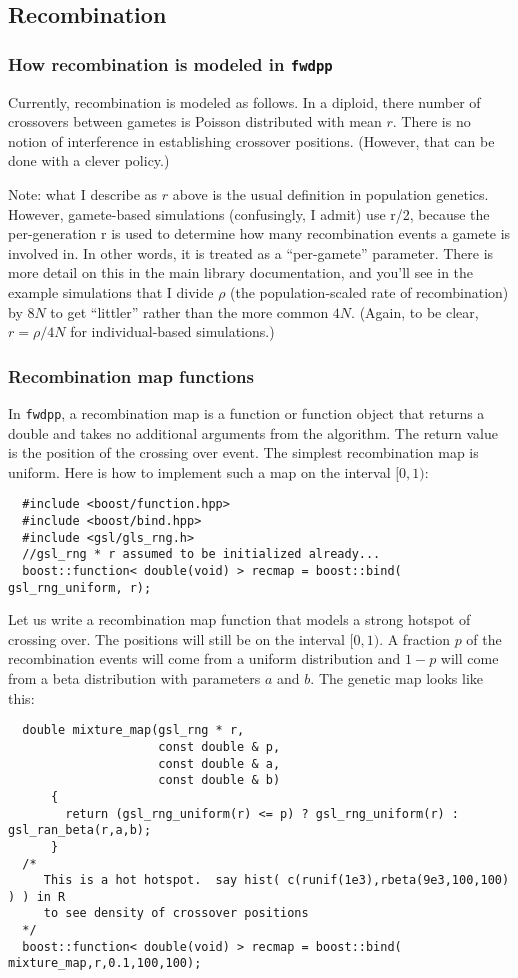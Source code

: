 \documentclass{article}
\begin{document}
\subsection{Recombination}
\subsubsection{\label{recmodel}How recombination is modeled in \texttt{fwdpp}}
Currently, recombination is modeled as follows.  In a diploid, there number of crossovers between gametes is Poisson distributed with mean $r$.  There is no notion of interference in establishing crossover positions.  (However, that can be done with a clever policy.)

Note: what I describe as $r$ above is the usual definition in population genetics. However, gamete-based simulations (confusingly, I admit) use r/2, because the per-generation r is used to determine how many recombination events a gamete is involved in.  In other words, it is treated as a ``per-gamete'' parameter.  There is more detail on this in the main library documentation, and you'll see in the example simulations that I divide $\rho$ (the population-scaled rate of recombination) by $8N$ to get ``littler'' rather than the more common $4N$.  (Again, to be clear, $r=\rho/4N$ for individual-based simulations.)

\subsubsection{Recombination map functions}
In \texttt{fwdpp}, a recombination map is a function or function object that returns a double and takes no additional arguments from the algorithm.  The return value is the position of the crossing over event.  The simplest recombination map is uniform.  Here is how to implement such a map on the interval $[0,1)$:

\begin{lstlisting}
  #include <boost/function.hpp>
  #include <boost/bind.hpp>
  #include <gsl/gls_rng.h>
  //gsl_rng * r assumed to be initialized already...
  boost::function< double(void) > recmap = boost::bind( gsl_rng_uniform, r);
\end{lstlisting}

Let us write a recombination map function that models a strong hotspot of crossing over.  The positions will still be on the interval $[0,1)$.  A fraction $p$ of the recombination events will come from a uniform distribution and $1-p$ will come from a beta distribution with parameters $a$ and $b$.  The genetic map looks like this:
\begin{lstlisting}
  double mixture_map(gsl_rng * r, 
                     const double & p,
                     const double & a,
                     const double & b)
      {
        return (gsl_rng_uniform(r) <= p) ? gsl_rng_uniform(r) : gsl_ran_beta(r,a,b);
      }
  /*
     This is a hot hotspot.  say hist( c(runif(1e3),rbeta(9e3,100,100) ) ) in R 
     to see density of crossover positions
  */
  boost::function< double(void) > recmap = boost::bind( mixture_map,r,0.1,100,100);
\end{lstlisting}
\end{document}
